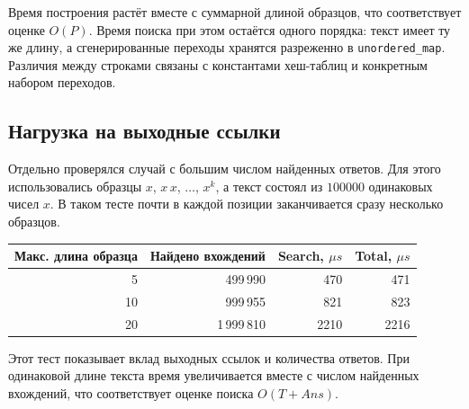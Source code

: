 Время построения растёт вместе с суммарной длиной образцов, что соответствует оценке \(O(P)\).
Время поиска при этом остаётся одного порядка: текст имеет ту же длину, а сгенерированные переходы
хранятся разреженно в \texttt{unordered\_map}. Различия между строками связаны с константами хеш-таблиц
и конкретным набором переходов.

\subsection{Нагрузка на выходные ссылки}

Отдельно проверялся случай с большим числом найденных ответов. Для этого использовались образцы
\(x\), \(x\,x\), \(\ldots\), \(x^k\), а текст состоял из \(100000\) одинаковых чисел \(x\). В таком
тесте почти в каждой позиции заканчивается сразу несколько образцов.

\begin{center}
\begin{tabular}{|r|r|r|r|}
\hline
\rowcolor{lightgray}
Макс. длина образца & Найдено вхождений & Search, \(\mu s\) & Total, \(\mu s\) \\
\hline
5 & 499\,990 & 470 & 471 \\
\hline
10 & 999\,955 & 821 & 823 \\
\hline
20 & 1\,999\,810 & 2210 & 2216 \\
\hline
\end{tabular}
\end{center}

Этот тест показывает вклад выходных ссылок и количества ответов. При одинаковой длине текста время
увеличивается вместе с числом найденных вхождений, что соответствует оценке поиска \(O(T + Ans)\).
\pagebreak
